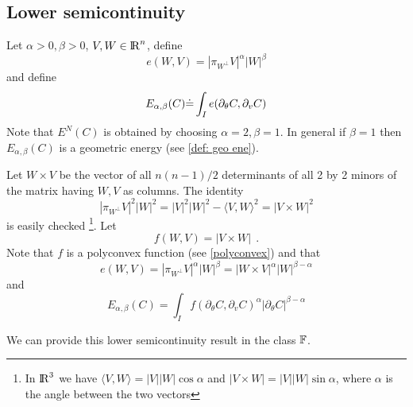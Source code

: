 \documentclass[twoside,a4paper,english]{article}
\def\derpar#1{\partial_{#1}}
\begin{document}

\subsection{Lower semicontinuity}
\label{sec: lsc}

\begingroup
\def\a{\alpha}
\def\b{\beta}
\def\t{\theta}

Let $\a>0, \b>0$, $V,W\in{\protect\mathrm{l\hskip-0.15em R}}^n$,  define  
\[ e(W,V) = |\pi_{W^\perp}V |^\a |W|^\b \]
and define
\[E_{\a,\b}(C) \defeq   \int_I e(\derpar\t C,\derpar v C) \] 
Note that $E^N(C)$ is obtained by choosing $\a=2,\b=1$.
In general if $\beta=1$ then $E_{\a,\b}(C)$ is a geometric energy
(see \ref{def: geo ene}).


Let $W\times V$ be the vector of all $n(n-1)/2$
determinants of all 2 by 2 minors of the matrix having $W,V$ as
columns.
The identity 
\[ |\pi_{W^\perp}V |^2 |W|^2 =
  |V|^2|W|^2 -\langle  V,W\rangle^2=|V\times W|^2 \]
is easily checked 
\footnote{In ${\protect\mathrm{l\hskip-0.15em R}}^3$ we have
  $\langle V,W\rangle=|V||W|\cos\alpha$ and $|V\times W|=|V||W|\sin\alpha$,
  where $\alpha$ is the angle between the two vectors}.
Let   
\[ f(W,V)=|V\times W| ~~. \]
Note that $f$ is a polyconvex function (see \ref{polyconvex})
and that
\begin{equation}
  e(W,V) = |\pi_{W^\perp}V |^\a |W|^\b = |W\times V|^\a |W|^{\b-\a} 
  \label{eq:|VxW|}
\end{equation}
and
\[ E_{\a,\b}(C)= \int_I f(\derpar \theta C,\derpar v C)^{\a}
|\derpar\theta C|^{\b-\a} \]

\smallskip

We can provide this lower semicontinuity result in the class ${\mathbb F}$.
\end{document}
